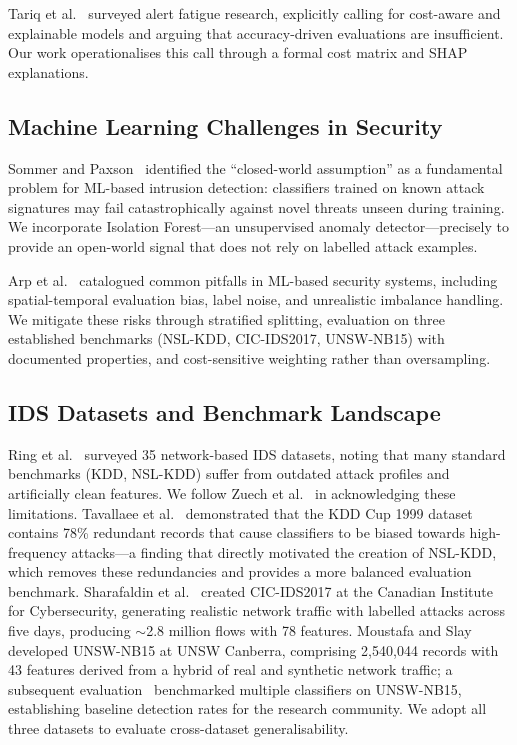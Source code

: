\documentclass[conference]{IEEEtran}
\begin{document}
Tariq et al.~\cite{tariq2025} surveyed alert fatigue research, explicitly calling for
cost-aware and explainable models and arguing that accuracy-driven evaluations are insufficient.
Our work operationalises this call through a formal cost matrix and SHAP explanations.

\subsection{Machine Learning Challenges in Security}
Sommer and Paxson~\cite{sommer2010} identified the ``closed-world assumption'' as a fundamental
problem for ML-based intrusion detection: classifiers trained on known attack signatures may fail
catastrophically against novel threats unseen during training.
We incorporate Isolation Forest---an unsupervised anomaly detector---precisely to provide
an open-world signal that does not rely on labelled attack examples.

Arp et al.~\cite{arp2022} catalogued common pitfalls in ML-based security systems, including
spatial-temporal evaluation bias, label noise, and unrealistic imbalance handling.
We mitigate these risks through stratified splitting, evaluation on three
established benchmarks (NSL-KDD, CIC-IDS2017, UNSW-NB15) with documented
properties, and cost-sensitive weighting rather than oversampling.

\subsection{IDS Datasets and Benchmark Landscape}
Ring et al.~\cite{ring2019} surveyed 35 network-based IDS datasets, noting that many standard
benchmarks (KDD, NSL-KDD) suffer from outdated attack profiles and artificially clean features.
We follow Zuech et al.~\cite{zuech2015} in acknowledging these limitations.
Tavallaee et al.~\cite{tavallaee2009} demonstrated that the KDD Cup 1999 dataset contains
78\% redundant records that cause classifiers to be biased towards high-frequency attacks---a
finding that directly motivated the creation of NSL-KDD, which removes these redundancies
and provides a more balanced evaluation benchmark.
Sharafaldin et al.~\cite{sharafaldin2018} created CIC-IDS2017 at the Canadian Institute for
Cybersecurity, generating realistic network traffic with labelled attacks across five days,
producing $\sim$2.8 million flows with 78 features.
Moustafa and Slay~\cite{moustafa2015} developed UNSW-NB15 at UNSW Canberra, comprising
2,540,044 records with 43 features derived from a hybrid of real and synthetic network traffic;
a subsequent evaluation~\cite{moustafa2016} benchmarked multiple classifiers on UNSW-NB15,
establishing baseline detection rates for the research community.
We adopt all three datasets to evaluate cross-dataset generalisability.
\end{document}
